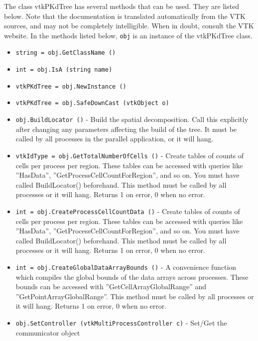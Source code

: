 The class vtkPKdTree has several methods that can be used.
  They are listed below.
Note that the documentation is translated automatically from the VTK sources,
and may not be completely intelligible.  When in doubt, consult the VTK website.
In the methods listed below, \verb|obj| is an instance of the vtkPKdTree class.
\begin{itemize}
\item  \verb|string = obj.GetClassName ()|

\item  \verb|int = obj.IsA (string name)|

\item  \verb|vtkPKdTree = obj.NewInstance ()|

\item  \verb|vtkPKdTree = obj.SafeDownCast (vtkObject o)|

\item  \verb|obj.BuildLocator ()| -    Build the spatial decomposition.  Call this explicitly
   after changing any parameters affecting the build of the
   tree.  It must be called by all processes in the parallel
   application, or it will hang.  

\item  \verb|vtkIdType = obj.GetTotalNumberOfCells ()| -    Create tables of counts of cells per process per region.
   These tables can be accessed with queries like
   ''HasData'', ''GetProcessCellCountForRegion'', and so on.
   You must have called BuildLocator() beforehand.  This
   method must be called by all processes or it will hang.
   Returns 1 on error, 0 when no error.

\item  \verb|int = obj.CreateProcessCellCountData ()| -    Create tables of counts of cells per process per region.
   These tables can be accessed with queries like
   ''HasData'', ''GetProcessCellCountForRegion'', and so on.
   You must have called BuildLocator() beforehand.  This
   method must be called by all processes or it will hang.
   Returns 1 on error, 0 when no error.

\item  \verb|int = obj.CreateGlobalDataArrayBounds ()| -    A convenience function which compiles the global 
   bounds of the data arrays across processes.  
   These bounds can be accessed with 
   ''GetCellArrayGlobalRange'' and ''GetPointArrayGlobalRange''.
   This method must be called by all processes or it will hang.
   Returns 1 on error, 0 when no error.

\item  \verb|obj.SetController (vtkMultiProcessController c)| -    Set/Get the communicator object


\end{itemize}
